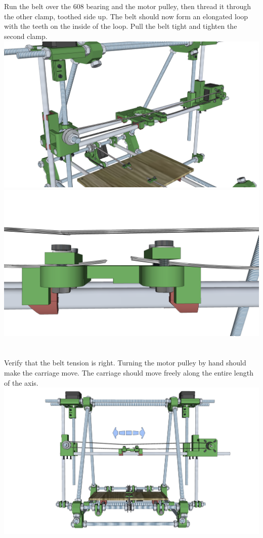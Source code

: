 \documentclass[twoside,openany,a4paper,titlepage]{memoir}
\begin{document}
	\section{}
	Run the belt over the 608 bearing and the motor pulley, then thread it through the other clamp, toothed
	side up. The belt should now form an elongated loop with the teeth on the inside of the loop. Pull the
	belt tight and tighten the second clamp.\\
	\includegraphics[width=1\linewidth]{graphics/ch9_15_1.png}
	\includegraphics[width=1\linewidth]{graphics/ch9_15_2.png}
	
	\section{}
	Verify that the belt tension is right. Turning the motor pulley by hand should make the carriage move.
	The carriage should move freely along the entire length of the axis.\\
	\includegraphics[width=1\linewidth]{graphics/ch9_16.png}
	
\end{document}
